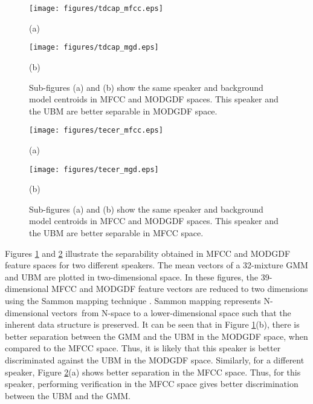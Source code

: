 \documentclass{article}
\begin{document}
\begin{figure}[h]
\centering 
\begin{minipage}[c]{0.5\textwidth}
\centering 
    \texttt{[image: figures/tdcap\_mfcc.eps]}
	\caption*{(a)}
\end{minipage}%
\begin{minipage}[c]{0.35\textwidth}
\centering  
    \texttt{[image: figures/tdcap\_mgd.eps]}
	\caption*{(b)}
\end{minipage}
\caption{Sub-figures (a) and (b) show the same speaker and background model
centroids in MFCC and MODGDF spaces. This speaker and the UBM are better
separable in MODGDF space.}
\label{fig:ubm_sep1}
\end{figure}

\begin{figure}[h]
\centering 
\begin{minipage}[c]{0.45\textwidth}
\centering 
    \texttt{[image: figures/tecer\_mfcc.eps]}
	\caption*{(a)}
\end{minipage}%
\begin{minipage}[c]{0.45\textwidth}
\centering  
    \texttt{[image: figures/tecer\_mgd.eps]}
	\caption*{(b)}
\end{minipage}
\caption{Sub-figures (a) and (b) show the same speaker and background model
centroids in MFCC and MODGDF spaces. This speaker and the UBM are better
separable in MFCC space.}
\label{fig:ubm_sep2}
\end{figure}

Figures \ref{fig:ubm_sep1} and \ref{fig:ubm_sep2} illustrate the
separability obtained in MFCC and MODGDF feature spaces for two different
speakers. The mean vectors of a 32-mixture GMM and UBM are plotted in
two-dimensional space. In these figures, the 39-dimensional MFCC and MODGDF
feature vectors are reduced to two dimensions using the Sammon mapping technique
\cite{sammon}. Sammon mapping represents N-dimensional vectors\ from N-space to 
a lower-dimensional space such that the inherent data structure is preserved. 
 It can be seen that in Figure \ref{fig:ubm_sep1}(b), there is
 better separation between the GMM and the UBM in the MODGDF space, when compared
 to the MFCC space. Thus, it is likely that this speaker is better discriminated
 against the UBM in the MODGDF space. Similarly, for a different speaker, 
 Figure \ref{fig:ubm_sep2}(a) shows better separation in the MFCC space. Thus,
 for this speaker, performing verification in the MFCC space gives better
 discrimination between the UBM and the GMM. 
\end{document}

